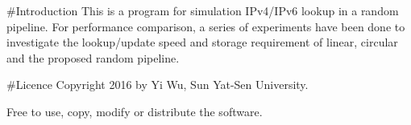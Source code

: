 \#\-Introduction This is a program for simulation I\-Pv4/\-I\-Pv6 lookup in a random pipeline. For performance comparison, a series of experiments have been done to investigate the lookup/update speed and storage requirement of linear, circular and the proposed random pipeline.

\#\-Licence Copyright 2016 by Yi Wu, Sun Yat-\/\-Sen University.

Free to use, copy, modify or distribute the software. 